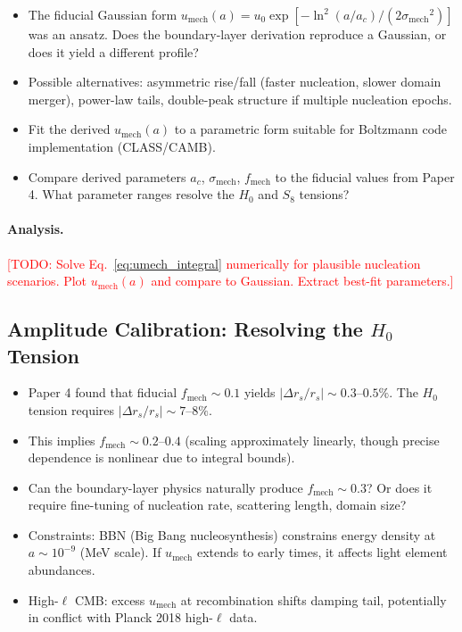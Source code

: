 \documentclass[11pt,a4paper]{article}
\newcommand{\umech}{\ensuremath{u_{\mathrm{mech}}}}
\newcommand{\fmech}{\ensuremath{f_{\mathrm{mech}}}}
\newcommand{\ac}{\ensuremath{a_c}}
\newcommand{\sigmamech}{\ensuremath{\sigma_{\mathrm{mech}}}}
\newcommand{\rs}{\ensuremath{r_s}}
\theoremstyle{definition}
\theoremstyle{remark}
\begin{document}
\begin{itemize}[leftmargin=*, itemsep=0.3em]
\item The fiducial Gaussian form $\umech(a) = u_0 \exp[-\ln^2(a/\ac)/(2\sigmamech^2)]$ was an ansatz. Does the boundary-layer derivation reproduce a Gaussian, or does it yield a different profile?
\item Possible alternatives: asymmetric rise/fall (faster nucleation, slower domain merger), power-law tails, double-peak structure if multiple nucleation epochs.
\item Fit the derived $\umech(a)$ to a parametric form suitable for Boltzmann code implementation (CLASS/CAMB).
\item Compare derived parameters $\ac$, $\sigmamech$, $\fmech$ to the fiducial values from Paper 4. What parameter ranges resolve the $H_0$ and $S_8$ tensions?
\end{itemize}

\paragraph{Analysis.}
\textcolor{red}{[TODO: Solve Eq.~\ref{eq:umech_integral} numerically for plausible nucleation scenarios. Plot $\umech(a)$ and compare to Gaussian. Extract best-fit parameters.]}

\subsection{Amplitude Calibration: Resolving the $H_0$ Tension}
\label{sec:amplitude_calibration}

\begin{itemize}[leftmargin=*, itemsep=0.3em]
\item Paper 4 found that fiducial $\fmech \sim 0.1$ yields $|\Delta\rs/\rs| \sim 0.3$--$0.5\%$. The $H_0$ tension requires $|\Delta\rs/\rs| \sim 7$--$8\%$.
\item This implies $\fmech \sim 0.2$--$0.4$ (scaling approximately linearly, though precise dependence is nonlinear due to integral bounds).
\item Can the boundary-layer physics naturally produce $\fmech \sim 0.3$? Or does it require fine-tuning of nucleation rate, scattering length, domain size?
\item Constraints: BBN (Big Bang nucleosynthesis) constrains energy density at $a \sim 10^{-9}$ (MeV scale). If $\umech$ extends to early times, it affects light element abundances.
\item High-$\ell$ CMB: excess $\umech$ at recombination shifts damping tail, potentially in conflict with Planck 2018 high-$\ell$ data.
\end{itemize}
\end{document}
